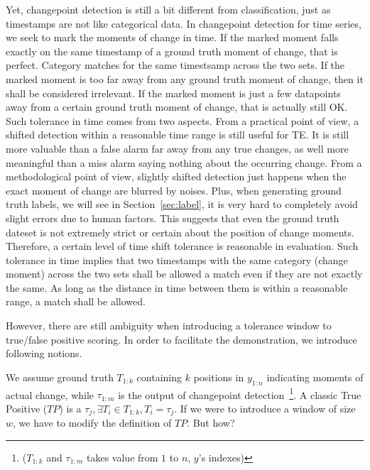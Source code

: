 Yet, changepoint detection is still a bit different from classification, just as timestamps are not like categorical data.
In changepoint detection for time series, we seek to mark the moments of change in time. 
If the marked moment falls exactly on the same timestamp of a ground truth moment of change, that is perfect. Category matches for the same timestsamp across the two sets.
If the marked moment is too far away from any ground truth moment of change, then it shall be considered irrelevant.
If the marked moment is just a few datapoints away from a certain ground truth moment of change, that is actually still OK.
Such tolerance in time comes from two aspects.
From a practical point of view, a shifted detection within a reasonable time range is still useful for TE.
It is still more valuable than a false alarm far away from any true changes, as well more meaningful than a miss alarm saying nothing about the occurring change.
From a methodological point of view, slightly shifted detection just happens when  the exact moment of change are blurred by noises.
Plus, when generating ground truth labels, we will see in Section~\ref{sec:label}, it is very hard to completely avoid slight errors due to human factors.
This suggests that even the ground truth dateset is not extremely strict or certain about the position of change moments.
Therefore, a certain level of time shift tolerance is reasonable in evaluation.
Such tolerance in time implies that two timestamps with the same category (change moment) across the two sets shall be allowed a match even if they are not exactly the same. 
As long as the distance in time between them is within a reasonable range, a match shall be allowed.

However, there are still ambiguity when introducing a tolerance window to true/false positive scoring.
In order to facilitate the demonstration, we introduce following notions.

We assume ground truth $T_{1:k}$ containing $k$ positions in $y_{1:n}$ indicating moments of actual change, while $\tau_{1:m}$ is the output of changepoint detection~\footnote{($T_{1:k}$ and $\tau_{1:m}$ takes value from $1$ to $n$, $y$'s indexes)}.
A classic True Positive ($TP$) is a $\tau_j, \exists T_i \in T_{1:k}, T_i = \tau_j$.
If we were to introduce a window of size $w$, we have to modify the definition of $TP$. But how?

